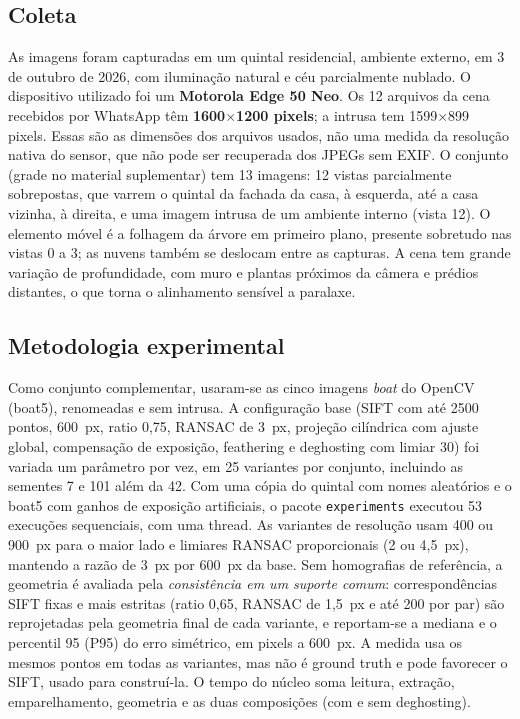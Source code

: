 \documentclass[10pt,a4paper]{article}
\begin{document}
\subsection{Coleta}
As imagens foram capturadas em um quintal residencial, ambiente externo, em 3 de outubro de 2026, com
iluminação natural e céu parcialmente nublado. O dispositivo utilizado foi um \textbf{Motorola Edge 50 Neo}.
Os 12 arquivos da cena recebidos por WhatsApp têm \textbf{1600$\times$1200 pixels}; a intrusa tem
1599$\times$899 pixels. Essas são as dimensões dos arquivos usados, não uma medida da resolução nativa do
sensor, que não pode ser recuperada dos JPEGs sem EXIF. O conjunto (grade no material suplementar) tem 13 imagens: 12
vistas parcialmente sobrepostas, que varrem o quintal da fachada da casa, à esquerda, até a casa vizinha,
à direita, e uma imagem intrusa de um ambiente interno (vista 12). O elemento móvel é a folhagem da árvore
em primeiro plano, presente sobretudo nas vistas 0 a 3; as nuvens também se deslocam entre as capturas. A
cena tem grande variação de profundidade, com muro e plantas próximos da câmera e prédios distantes, o que
torna o alinhamento sensível a paralaxe.

\subsection{Metodologia experimental}
Como conjunto complementar, usaram-se as cinco imagens \emph{boat} do OpenCV \cite{opencv} (boat5),
renomeadas e sem intrusa. A configuração base (SIFT com até 2500 pontos, 600~px, ratio 0,75, RANSAC de
3~px, projeção cilíndrica com ajuste global, compensação de exposição, feathering e deghosting com limiar
30) foi variada um parâmetro por vez, em 25 variantes por conjunto, incluindo as sementes 7 e 101 além da
42. Com uma cópia do quintal com nomes aleatórios e o boat5 com ganhos de exposição artificiais, o pacote
\texttt{experiments} executou 53 execuções sequenciais, com uma thread. As variantes de resolução usam
400 ou 900~px para o maior lado e limiares RANSAC proporcionais (2 ou 4,5~px), mantendo a razão de 3~px
por 600~px da base. Sem homografias de referência, a geometria é avaliada pela
\emph{consistência em um suporte comum}: correspondências SIFT fixas e mais estritas (ratio 0,65, RANSAC
de 1,5~px e até 200 por par) são reprojetadas pela geometria final de cada variante, e reportam-se a
mediana e o percentil 95 (P95) do erro simétrico, em pixels a 600~px. A medida usa os mesmos pontos em
todas as variantes, mas não é ground truth e pode favorecer o SIFT, usado para construí-la. O tempo do
núcleo soma leitura, extração, emparelhamento, geometria e as duas composições (com e sem deghosting).
\end{document}
